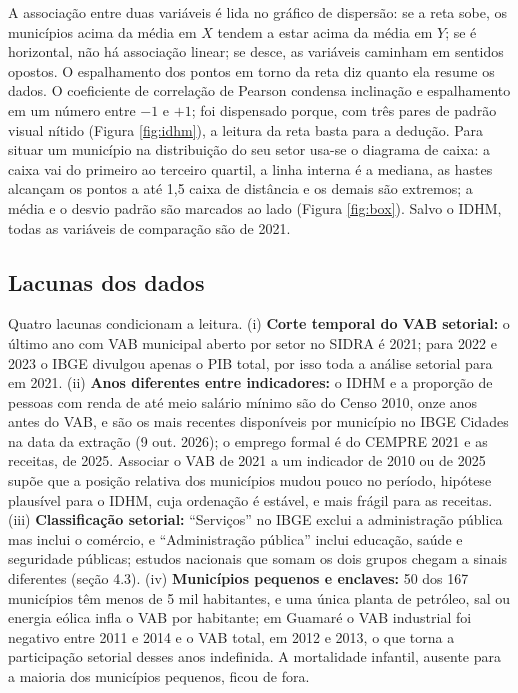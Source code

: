 \documentclass[12pt,a4paper]{article}
\begin{document}
A associação entre duas variáveis é lida no gráfico de dispersão: se a reta sobe, os municípios acima da média em $X$ tendem a estar acima da média em $Y$; se é horizontal, não há associação linear; se desce, as variáveis caminham em sentidos opostos. O espalhamento dos pontos em torno da reta diz quanto ela resume os dados. O coeficiente de correlação de Pearson condensa inclinação e espalhamento em um número entre $-1$ e $+1$; foi dispensado porque, com três pares de padrão visual nítido (Figura \ref{fig:idhm}), a leitura da reta basta para a dedução. Para situar um município na distribuição do seu setor usa-se o diagrama de caixa: a caixa vai do primeiro ao terceiro quartil, a linha interna é a mediana, as hastes alcançam os pontos a até 1,5 caixa de distância e os demais são extremos; a média e o desvio padrão são marcados ao lado (Figura \ref{fig:box}). Salvo o IDHM, todas as variáveis de comparação são de 2021.

\subsection{Lacunas dos dados}

Quatro lacunas condicionam a leitura. (i) \textbf{Corte temporal do VAB setorial:} o último ano com VAB municipal aberto por setor no SIDRA é 2021; para 2022 e 2023 o IBGE divulgou apenas o PIB total, por isso toda a análise setorial para em 2021. (ii) \textbf{Anos diferentes entre indicadores:} o IDHM e a proporção de pessoas com renda de até meio salário mínimo são do Censo 2010, onze anos antes do VAB, e são os mais recentes disponíveis por município no IBGE Cidades na data da extração (9 out. 2026); o emprego formal é do CEMPRE 2021 e as receitas, de 2025. Associar o VAB de 2021 a um indicador de 2010 ou de 2025 supõe que a posição relativa dos municípios mudou pouco no período, hipótese plausível para o IDHM, cuja ordenação é estável, e mais frágil para as receitas. (iii) \textbf{Classificação setorial:} ``Serviços'' no IBGE exclui a administração pública mas inclui o comércio, e ``Administração pública'' inclui educação, saúde e seguridade públicas; estudos nacionais que somam os dois grupos chegam a sinais diferentes (seção 4.3). (iv) \textbf{Municípios pequenos e enclaves:} 50 dos 167 municípios têm menos de 5 mil habitantes, e uma única planta de petróleo, sal ou energia eólica infla o VAB por habitante; em Guamaré o VAB industrial foi negativo entre 2011 e 2014 e o VAB total, em 2012 e 2013, o que torna a participação setorial desses anos indefinida. A mortalidade infantil, ausente para a maioria dos municípios pequenos, ficou de fora.
\end{document}
